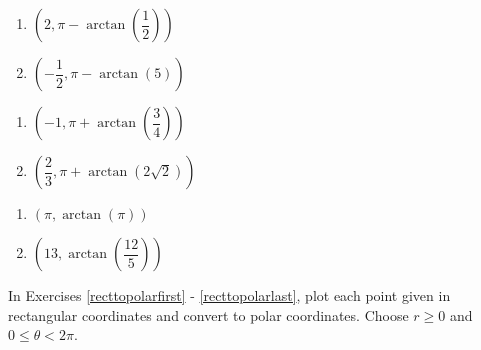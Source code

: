 \documentclass{ximera}
\begin{document}
\begin{multicols}{2} 

\begin{enumerate}

\setcounter{enumi}{\value{HW}}

\item $\left( 2, \pi - \arctan\left(\dfrac{1}{2}\right)  \right)$ 
\item $\left( -\dfrac{1}{2}, \pi - \arctan\left(5\right)  \right)$ 

\setcounter{HW}{\value{enumi}}

\end{enumerate}

\end{multicols}

\begin{multicols}{2} 

\begin{enumerate}

\setcounter{enumi}{\value{HW}}

\item $\left( -1, \pi + \arctan\left(\dfrac{3}{4}\right) \right)$ 
\item $\left( \dfrac{2}{3}, \pi + \arctan\left(2\sqrt{2}\right) \right)$

\setcounter{HW}{\value{enumi}}

\end{enumerate}

\end{multicols}

\begin{multicols}{2} 

\begin{enumerate}

\setcounter{enumi}{\value{HW}}

\item $\left( \pi, \arctan(\pi) \right)$ 
\item $\left( 13, \arctan \left( \dfrac{12}{5} \right) \right)$ \label{polartorectlast}

\setcounter{HW}{\value{enumi}}

\end{enumerate}

\end{multicols}

In Exercises \ref{recttopolarfirst} - \ref{recttopolarlast}, plot each point given in rectangular coordinates and convert to polar coordinates.  Choose $r \geq 0$ and $0 \leq \theta < 2\pi$.  
\end{document}
